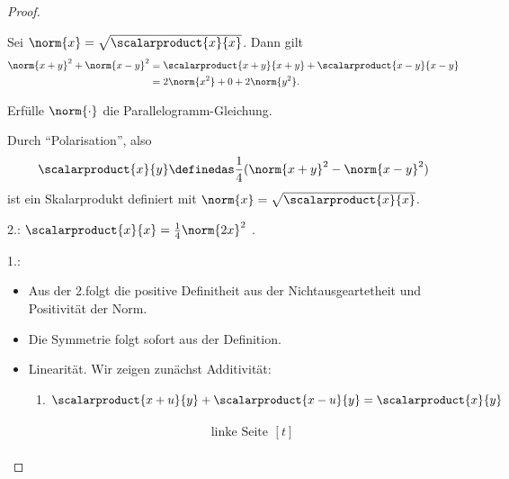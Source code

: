 \begin{proof}
    \begin{proofdescription}
        \item[\hin] Sei \( \norm{x}=\sqrt{\scalarproduct{x}{x}} \). Dann gilt
        \begin{align*}
            \norm{x+y}^2+\norm{x-y}^2 \begin{aligned}[t]
                &=\scalarproduct{x+y}{x+y}+\scalarproduct{x-y}{x-y}\\
                &=2\norm{x^2}+0+2\norm{y^2}.
            \end{aligned}
        \end{align*}
        \item[\rueck] Erfülle \( \norm{\cdot} \) die Parallelogramm-Gleichung.
        \begin{behauptung*}
            Durch \enquote{Polarisation}, also
            \begin{align*}
                \scalarproduct{x}{y}\definedas \frac{1}{4}(\norm{x+y}^2-\norm{x-y}^2)
            \end{align*}
            ist ein Skalarprodukt definiert mit \( \norm{x}=\sqrt{\scalarproduct{x}{x}} \).
        \end{behauptung*}
        \begin{subproof}
            \begin{proofdescription}
                \item[2.\@ \Beh:] \( \scalarproduct{x}{x}=\frac{1}{4}\norm{2x}^2 \) \checkmark.
                \item[1.\@ \Beh:] \begin{itemize}
                    \item Aus der 2.\@ \Beh folgt die positive Definitheit aus der Nichtausgeartetheit und Positivität der Norm.
                    \item Die Symmetrie folgt sofort aus der Definition.
                    \item Linearität. Wir zeigen zunächst Additivität:
                    \begin{enumerate}[label=\rechtsklammer{\arabic*}]
                        \item \( \scalarproduct{x+u}{y}+\scalarproduct{x-u}{y}=\scalarproduct{x}{y} \)
                        \begin{subproof}[denn:]
                            \begin{align*}
                                \text{linke Seite}\begin{aligned}[t]

\end{aligned}
\end{align*}
\end{subproof}
\end{enumerate}
\end{itemize}
\end{proofdescription}
\end{subproof}
\end{proofdescription}
\end{proof}
